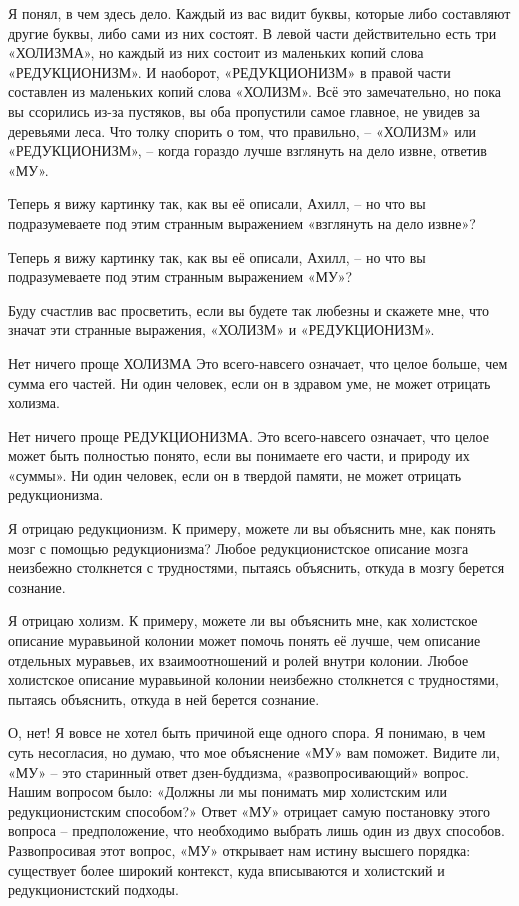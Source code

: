 \documentclass[../main.tex]{subfiles}
\begin{document}
\begin{dialogue}
 Я понял, в чем здесь дело. Каждый из вас видит буквы, которые либо составляют другие буквы, либо сами из них состоят. В левой части действительно есть три «ХОЛИЗМА», но каждый из них состоит из маленьких копий слова «РЕДУКЦИОНИЗМ». И наоборот, «РЕДУКЦИОНИЗМ» в правой части составлен из маленьких копий слова «ХОЛИЗМ». Всё это замечательно, но пока вы ссорились из-за пустяков, вы оба пропустили самое главное, не увидев за деревьями леса. Что толку спорить о том, что правильно, \--- «ХОЛИЗМ» или «РЕДУКЦИОНИЗМ», \--- когда гораздо лучше взглянуть на дело извне, ответив «МУ».

 Теперь я вижу картинку так, как вы её описали, Ахилл, \--- но что вы подразумеваете под этим странным выражением «взглянуть на дело извне»?

 Теперь я вижу картинку так, как вы её описали, Ахилл, \--- но что вы подразумеваете под этим странным выражением «МУ»?

 Буду счастлив вас просветить, если вы будете так любезны и скажете мне, что значат эти странные выражения, «ХОЛИЗМ» и «РЕДУКЦИОНИЗМ».

 Нет ничего проще ХОЛИЗМА Это всего-навсего означает, что целое больше, чем сумма его частей. Ни один человек, если он в здравом уме, не может отрицать холизма.

 Нет ничего проще РЕДУКЦИОНИЗМА. Это всего-навсего означает, что целое может быть полностью понято, если вы понимаете его части, и природу их «суммы». Ни один человек, если он в твердой памяти, не может отрицать редукционизма.

 Я отрицаю редукционизм. К примеру, можете ли вы объяснить мне, как понять мозг с помощью редукционизма? Любое редукционистское описание мозга неизбежно столкнется с трудностями, пытаясь объяснить, откуда в мозгу берется сознание.

 Я отрицаю холизм. К примеру, можете ли вы объяснить мне, как холистское описание муравьиной колонии может помочь понять её лучше, чем описание отдельных муравьев, их взаимоотношений и ролей внутри колонии. Любое холистское описание муравьиной колонии неизбежно столкнется с трудностями, пытаясь объяснить, откуда в ней берется сознание.

 О, нет! Я вовсе не хотел быть причиной еще одного спора. Я понимаю, в чем суть несогласия, но думаю, что мое объяснение «МУ» вам поможет. Видите ли, «МУ» \--- это старинный ответ дзен-буддизма, «развопросивающий» вопрос. Нашим вопросом было: «Должны ли мы понимать мир холистским или редукционистским способом?» Ответ «МУ» отрицает самую постановку этого вопроса \--- предположение, что необходимо выбрать лишь один из двух способов. Развопросивая этот вопрос, «МУ» открывает нам истину высшего порядка: существует более широкий контекст, куда вписываются и холистский и редукционистский подходы.


\end{dialogue}
\end{document}
